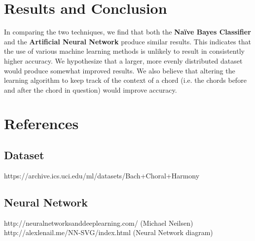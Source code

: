 \documentclass[a4paper]{article}
\begin{document}
\section{Results and Conclusion}
In comparing the two techniques, we find that both the \textbf{Naïve Bayes Classifier} and the \textbf{Artificial Neural Network} produce similar results. This indicates that the use of various machine learning methods is unlikely to result in consistently higher accuracy. We hypothesize that a larger, more evenly distributed dataset would produce somewhat improved results. We also believe that altering the learning algorithm to keep track of the context of a chord (i.e. the chords before and after the chord in question) would improve accuracy.



\section{References}
\subsection{Dataset}
https://archive.ics.uci.edu/ml/datasets/Bach+Choral+Harmony
\subsection{Neural Network}
http://neuralnetworksanddeeplearning.com/ (Michael Neilsen)\\
http://alexlenail.me/NN-SVG/index.html (Neural Network diagram)
\end{document}

